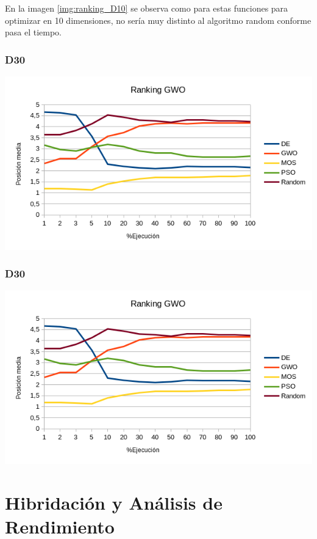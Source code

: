 \documentclass[a4paper, 12.5pt]{report}
\begin{document}
En la imagen \ref*{img:ranking_D10} se observa como para estas funciones para optimizar en 10 dimensiones, no sería muy distinto al algoritmo random conforme pasa el tiempo.


\subsubsection*{D30}

\includegraphics*[width=1\textwidth]{Resultados/basico/d10/Grafico_puestos.png} \label{img:ranking_D30}


\subsubsection*{D30}

\includegraphics*[width=1\textwidth]{Resultados/basico/d10/Grafico_puestos.png} \label{img:ranking_D30}

\section{Hibridación y Análisis de Rendimiento}
\end{document}
